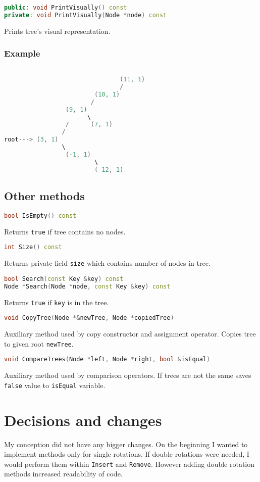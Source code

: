 \documentclass{article}
\begin{document}
\begin{lstlisting}[language=C++]
public: void PrintVisually() const
private: void PrintVisually(Node *node) const
\end{lstlisting}
Prints tree's visual representation.

\subsubsection*{Example}
\begin{lstlisting}[language=C++]

                                (11, 1)
                                /
                         (10, 1)
                        /
                 (9, 1)
                       \
                 /      (7, 1)
                /
root---> (3, 1)
                \
                 (-1, 1)
                         \
                         (-12, 1)
\end{lstlisting}
\vspace{\baselineskip}

\subsection{Other methods}

\begin{lstlisting}[language=C++]
bool IsEmpty() const
\end{lstlisting}
Returns {\tt true} if tree contains no nodes.

\begin{lstlisting}[language=C++]
int Size() const
\end{lstlisting}
Returns private field {\tt size} which contains number of nodes in tree.

\begin{lstlisting}[language=C++]
bool Search(const Key &key) const
Node *Search(Node *node, const Key &key) const
\end{lstlisting}
Returns {\tt true} if {\tt key} is in the tree.

\begin{lstlisting}[language=C++]
void CopyTree(Node *&newTree, Node *copiedTree)
\end{lstlisting}
Auxiliary method used by copy constructor and assignment operator. Copies tree to given
root {\tt newTree}.

\begin{lstlisting}[language=C++]
void CompareTrees(Node *left, Node *right, bool &isEqual)
\end{lstlisting}
Auxiliary method used by comparison operators. If trees are not the same saves {\tt false}
value to {\tt isEqual} variable.
\vspace{\baselineskip}

\section{Decisions and changes}

My conception did not have any bigger changes. On the beginning I wanted to implement
methods only for single rotations. If double rotations were needed, I would perform them
within {\tt Insert} and {\tt Remove}. However adding double rotation methods increased
readability of code.
\end{document}
